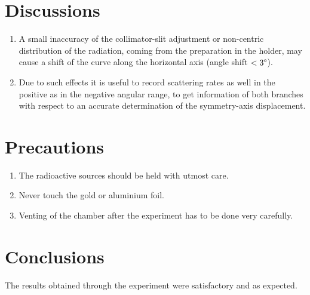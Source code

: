 \documentclass[%
 reprint,
nofootinbib,
 amsmath,amssymb,
 aps,
floatfix,
]{revtex4-2}
\begin{document}
\section{Discussions}
    \begin{enumerate}
        \item A small inaccuracy of the collimator-slit adjustment or non-centric distribution of the radiation, coming from the preparation in the holder, may cause a shift of the curve along the horizontal axis (angle shift $<3 \degree$).
        \item Due to such effects it is useful to record scattering rates as well in the positive as in the negative angular range, to get information of both branches with respect to an accurate determination of the symmetry-axis displacement.
    \end{enumerate}

\section{Precautions}
    \begin{enumerate}
        \item The radioactive sources should be held with utmost care.
        \item Never touch the gold or aluminium foil.
        \item Venting of the chamber after the experiment has to be done very carefully.
    \end{enumerate}
\section{Conclusions}
    The results obtained through the experiment were satisfactory and as expected.
\end{document}
